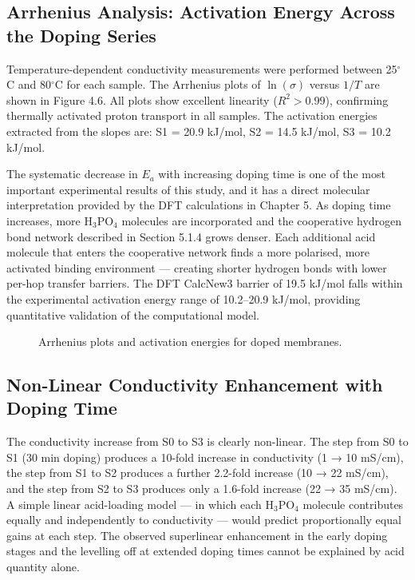 \documentclass[12pt,a4paper]{report}
\begin{document}
\subsection{Arrhenius Analysis: Activation Energy Across the Doping Series}
Temperature-dependent conductivity measurements were performed between 25\(^\circ\)C and 80\(^\circ\)C for each sample. The Arrhenius plots of \(\ln(\sigma)\) versus \(1/T\) are shown in Figure 4.6. All plots show excellent linearity (\(R^2 > 0.99\)), confirming thermally activated proton transport in all samples. The activation energies extracted from the slopes are: S1 = 20.9 kJ/mol, S2 = 14.5 kJ/mol, S3 = 10.2 kJ/mol.\cite{65,66}

The systematic decrease in \(E_a\) with increasing doping time is one of the most important experimental results of this study, and it has a direct molecular interpretation provided by the DFT calculations in Chapter 5. As doping time increases, more H\(_3\)PO\(_4\) molecules are incorporated and the cooperative hydrogen bond network described in Section 5.1.4 grows denser. Each additional acid molecule that enters the cooperative network finds a more polarised, more activated binding environment — creating shorter hydrogen bonds with lower per-hop transfer barriers. The DFT CalcNew3 barrier of 19.5 kJ/mol falls within the experimental activation energy range of 10.2–20.9 kJ/mol, providing quantitative validation of the computational model.\cite{21,72,73}

\begin{figure}[h!]
\centering
{}
\caption{Arrhenius plots and activation energies for doped membranes.}
\label{fig:arrhenius}
\end{figure}

\subsection{Non-Linear Conductivity Enhancement with Doping Time}
The conductivity increase from S0 to S3 is clearly non-linear. The step from S0 to S1 (30 min doping) produces a 10-fold increase in conductivity (1 → 10 mS/cm), the step from S1 to S2 produces a further 2.2-fold increase (10 → 22 mS/cm), and the step from S2 to S3 produces only a 1.6-fold increase (22 → 35 mS/cm). A simple linear acid-loading model — in which each H\(_3\)PO\(_4\) molecule contributes equally and independently to conductivity — would predict proportionally equal gains at each step. The observed superlinear enhancement in the early doping stages and the levelling off at extended doping times cannot be explained by acid quantity alone.\cite{57,58}
\end{document}
